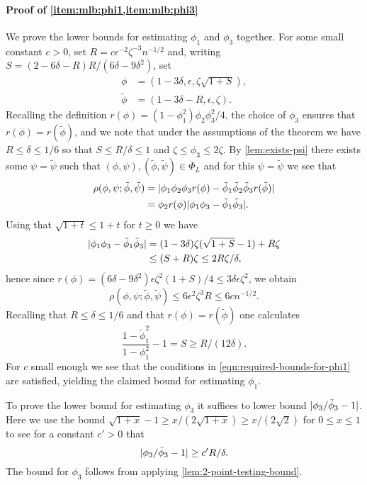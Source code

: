 \documentclass[journal]{IEEEtran}
\newcommand{\1}{\boldsymbol{1}}
\DeclarePairedDelimiter{\abs}{\lvert}{\rvert}
\begin{document}
\paragraph{Proof of \cref{item:mlb:phi1,item:mlb:phi3}}
We prove the lower bounds for estimating $\phi_1$ and $\phi_3$ together.
For some small constant $c>0$, set $R=c\epsilon^{-2}\zeta^{-3}n^{-1/2}$ and, writing $S=(2-6\delta-R)R/(6\delta-9\delta^2)$, set
\begin{align*} \phi&=(1-3\delta,\epsilon,\zeta \sqrt{1+S}),\\
	\tilde{\phi}&=(1-3\delta-R,\epsilon,\zeta).
\end{align*}
Recalling the definition $r(\phi)=(1-\phi_1^2)\phi_2\phi_3^2/4$, the choice of $\phi_3$ ensures that $r(\phi)=r(\tilde{\phi})$, and we note that under the assumptions of the theorem we have $R\leq \delta\leq 1/6$ so that $S\leq R/\delta\leq 1$ and $\zeta\leq \phi_3\leq 2\zeta$. By \cref{lem:exists-psi} there exists some $\psi=\tilde{\psi}$ such that $(\phi,\psi),(\tilde{\phi},\tilde{\psi})\in\Phi_L$ and for this $\psi=\tilde{\psi}$ we see that
\begin{align*}
  \rho(\phi,\psi;\tilde{\phi},\tilde{\psi})
  &=\abs{\phi_1\phi_2\phi_3 r(\phi) - \tilde{\phi}_1\tilde{\phi}_2\tilde{\phi}_3 r(\tilde{\phi})}\\
  &= \phi_2 r(\phi)\abs{\phi_1\phi_3-\tilde{\phi}_1\tilde{\phi}_3}.
\end{align*}
Using that $\sqrt{1+t}\leq 1+t$ for $t\geq 0$ we have
\begin{align*}
  \abs{\phi_1\phi_3-\tilde{\phi}_1\tilde{\phi}_3}
  &= (1-3\delta)\zeta(\sqrt{1+S}-1)+R\zeta\\
  &\leq (S+R)\zeta\leq 2R\zeta/\delta,
\end{align*}
hence since $r(\phi)=(6\delta-9\delta^2)\epsilon \zeta^2(1+S)/4 \leq 3\delta \epsilon \zeta^2$, we obtain
\[\rho(\phi,\psi;\tilde{\phi},\tilde{\psi})\leq 6\epsilon^2 \zeta^3 R \leq 6cn^{-1/2}.\]
Recalling that $R\leq \delta\leq 1/6$ and that $r(\phi)=r(\tilde{\phi})$ one calculates
\[ \frac{1-\tilde{\phi}_1^2}{1-\phi_1^2}-1 = S\geq R/(12\delta).\]
For $c$ small enough we see that the conditions in \cref{eqn:required-bounds-for-phi1} are satisfied, yielding the claimed bound for estimating $\phi_1$.

To prove the lower bound for estimating $\phi_3$ it suffices to lower bound $\abs{\phi_3/\tilde{\phi}_3-1}$. Here we use the bound $\sqrt{1+x}-1\geq x/(2\sqrt{1+x})\geq x/(2\sqrt{2})$ for $0\leq x\leq 1$ to see for a constant $c'>0$ that
\[ \abs{\phi_3/\tilde{\phi}_3-1}\geq c'R/\delta.\] The bound for $\phi_3$ follows from applying \cref{lem:2-point-testing-bound}.
\end{document}
